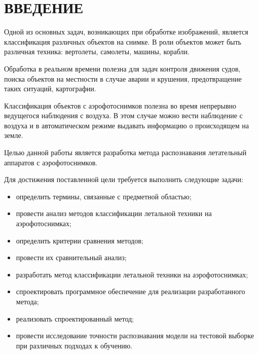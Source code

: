 \chapter*{ВВЕДЕНИЕ}

Одной из основных задач, возникающих при обработке изображений, является классификация различных объектов на снимке. В роли объектов может быть различная техника: вертолеты, самолеты, машины, корабли.

Обработка в реальном времени полезна для задач контроля движения судов, поиска объектов на местности в случае аварии и крушения, предотвращение таких ситуаций, картографии.

Классификация объектов с аэрофотоснимков полезна во время непрерывно ведущегося наблюдения с воздуха. В этом случае можно вести наблюдение с воздуха и в автоматическом режиме выдавать информацию о происходящем на земле.

Целью данной работы является разработка метода распознавания летательный аппаратов с аэрофотоснимков.

Для достижения поставленной цели требуется выполнить следующие задачи:
\begin{itemize}
	\item определить термины, связанные с предметной областью;
	\item провести анализ методов классификации летальной техники на аэрофотоснимках;
	\item определить критерии сравнения методов;
	\item провести их сравнительный анализ;
	\item разработать метод классификации летальной техники на аэрофотоснимках;
	\item спроектировать программное обеспечение для реализации разработанного метода;
	\item реализовать спроектированный метод;
	\item провести исследование точности распознавания модели на тестовой выборке при различных подходах к обучению.
	
\end{itemize}